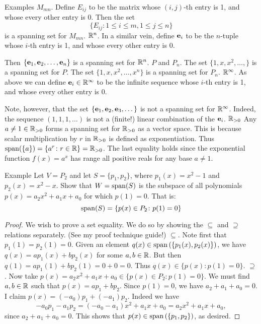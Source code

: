 \begin{frame}{Examples}
\alert{$M_{mn}$}. Define $E_{ij}$ to be the matrix whose $(i,j)$-th entry is 1, and whose every other entry is 0. Then the set 
\[
\{ E_{ij}\colon 1\leq i\leq m, 1\leq j\leq n\}
\]
is a spanning set for $M_{mn}$. 
\bpause
\alert{${\mathbb R}^n$}. In a similar vein, define ${\mathbf e}_i$ to be the $n$-tuple whose $i$-th entry is 1, and whose every other entry is 0.

Then $\{{\mathbf e}_1, {\mathbf e}_2, \dots, {\mathbf e}_n\}$ is a spanning set for ${\mathbb R}^n$. 
\bpause 
\alert{$P$ and $P_n$}. The set $\{1, x, x^2, \dots, \}$ is a spanning set for $P$. The set $\{1, x, x^2, \dots, x^n\}$ is a spanning set for $P_n$. 
\bpause
\alert{${\mathbb R}^\infty$}. As above we can define ${\mathbf e}_i\in {\mathbb R}^\infty$ to be the infinite sequence whose $i$-th entry is 1, and whose every other entry is $0$. 

Note, however, that the set $\{{\mathbf e}_1, {\mathbf e}_2, {\mathbf e}_3, \dots\}$ is \alert{not} a spanning set for ${\mathbb R}^\infty$.
\bpause
Indeed, the sequence $(1,1,1,\dots)$ is not a (finite!) linear combination of the ${\mathbf e}_i$. 
\bpause
\alert{${\mathbb R}_{>0}$} Any $a\ne 1\in {\mathbb R}_{>0}$ forms a spanning set for ${\mathbb R}_{>0}$ as a vector space. This is because scalar multiplication by $r$ in ${\mathbb R}_{>0}$ is defined as exponentiation. Thus $\operatorname{span}(\{a\})=\{a^r\colon r\in{\mathbb R}\}={\mathbb R}_{>0}$. The last equality holds since the exponential function $f(x)=a^x$ has range all positive reals for any base $a\ne 1$. 
\end{frame}
\begin{frame}{Example}
Let $V=P_2$ and let $S=\{p_1, p_2\}$, where $p_1(x)=x^2-1$ and $p_2(x)=x^2-x$. Show that $W=\operatorname{span}(S)$ is the subspace of all polynomials $p(x)=a_2x^2+a_1x+a_0$ for which $p(1)=0$. That is:
\[
\operatorname{span}(S)=\{p(x)\in P_2\colon p(1)=0\}
\]
\pause
\begin{proof}
We wish to prove a \alert{set equality}. We do so by showing the $\subseteq$ and $\supseteq$ relations separately.  (See my proof technique guide!)
\bpause 
\alert{$\subseteq$}. Note first that $p_1(1)=p_2(1)=0$. Given an element $q(x)\in \operatorname{span}\left(\{p_1(x), p_2(x)\}\right)$, we have $q(x)=ap_1(x)+bp_2(x)$ for some $a, b\in {\mathbb R}$. But then $q(1)=ap_1(1)+bp_2(1)=0+0=0$. Thus $q(x)\in \{p(x)\colon p(1)=0\}$. 
\bpause
\alert{$\supseteq$}. Now take $p(x)=a_2x^2+a_1x+a_0\in \{p(x)\in P_2\colon p(1)=0\}$. We must find $a, b\in {\mathbb R}$ such that $p(x)=ap_1+bp_2$. 
\bpause Since $p(1)=0$, we have $a_2+a_1+a_0=0$. I claim $p(x)=(-a_0)p_1+(-a_1)p_2$. Indeed we have 
\[
-a_0p_1-a_1p_2=(-a_0-a_1)x^2+a_1x+a_0=a_2x^2+a_1x+a_0,
\]
since $a_2+a_1+a_0=0$. This shows that $p(x)\in\operatorname{span}\left(\{p_1, p_2\}\right)$, as desired. 
\end{proof}
\end{frame}
